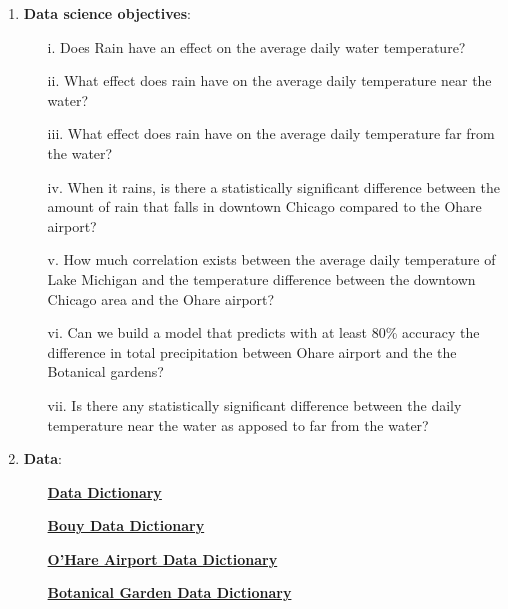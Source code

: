 \documentclass[10pt]{article}
\begin{document}
\begin{enumerate}[\null]

\item \textbf{Data science objectives}:
\begin{enumerate}
\item[i.] Does Rain have an effect on the average daily water temperature?
\item[ii.] What effect does rain have on the average daily temperature near the water?
\item[iii.] What effect does rain have on the average daily temperature far from the water?
\item[iv.] When it rains, is there a statistically significant difference between the amount of rain that falls in downtown Chicago compared to the Ohare airport?
\item[v.] How much correlation exists between the average daily temperature of Lake Michigan and the temperature difference between the downtown Chicago area and the Ohare airport?
\item[vi.] Can we build a model that predicts with at least 80\% accuracy the difference in total precipitation between Ohare airport and the the Botanical gardens?
\item[vii.] Is there any statistically significant difference between the daily temperature near the water as apposed to far from the water?
\end{enumerate}
 


\item \textbf{Data}: 

\begin{enumerate}
\item[] \href{https://render.githubusercontent.com/view/ipynb?commit=3611d432f79b839ababa4ab30f3e6c71b4c65107&enc_url=68747470733a2f2f7261772e67697468756275736572636f6e74656e742e636f6d2f426c616b6557616c6c6163652f4c616b655f4d6963686967616e5f496e666c75656e6365732f333631316434333266373962383339616261626134616233306633653663373162346336353130372f646174612f446174615f44696374696f6e61726965732f446174615f44696374696f6e6172792e6970796e62&nwo=BlakeWallace%2FLake_Michigan_Influences&path=data%2FData_Dictionaries%2FData_Dictionary.ipynb&repository_id=183659877&repository_type=Repository#Data-Dictionary}{\textbf{Data Dictionary}}
\item[] \href{https://www.ndbc.noaa.gov/measdes.shtml}{\textbf{Bouy Data Dictionary}}
\item[] \href{https://www1.ncdc.noaa.gov/pub/data/ghcn/daily/readme.txt}{\textbf{O'Hare Airport Data Dictionary}}
\item[] \href{https://www1.ncdc.noaa.gov/pub/data/ghcn/daily/readme.txt}{\textbf{Botanical Garden Data Dictionary}}


\end{enumerate}
\end{enumerate}
\end{document}
